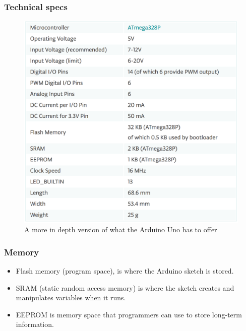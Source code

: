\begin{frame}
	\frametitle{Technical specs}
	\begin{figure}
		\includegraphics[scale=.14]{assets/spec} 
		\caption{A more in depth version of what the Arduino Uno has to offer}
	\end{figure}
\end{frame}

\begin{frame}
	\frametitle{Memory}
	\begin{itemize}
		\item Flash memory (program space), is where the Arduino sketch is stored.
		\item SRAM (static random access memory) is where the sketch creates and manipulates variables when it runs.
		\item EEPROM is memory space that programmers can use to store long-term information.	
	\end{itemize}
\end{frame}


